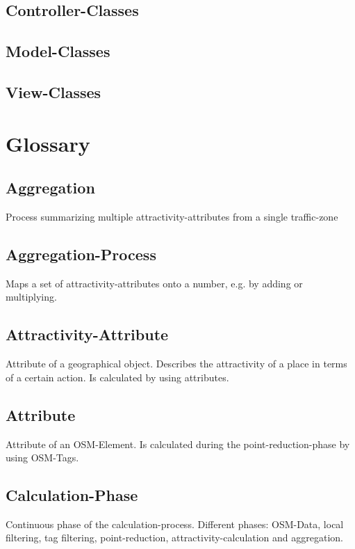 \documentclass[parskip=full]{scrartcl} %
\begin{document}
\subsection{Controller-Classes}

\subsection{Model-Classes}

\subsection{View-Classes}

\newpage


\section{Glossary}

\subsection*{Aggregation}
Process summarizing multiple attractivity-attributes from a single traffic-zone

\subsection*{Aggregation-Process}
Maps a set of attractivity-attributes onto a number, e.g. by adding or multiplying.

\subsection*{Attractivity-Attribute}
Attribute of a geographical object. Describes the attractivity of a place in terms of a certain action. Is calculated by using attributes.

\subsection*{Attribute}
Attribute of an OSM-Element. Is calculated during the point-reduction-phase by using OSM-Tags.

\subsection*{Calculation-Phase}
Continuous phase of the calculation-process. Different phases: OSM-Data, local filtering, tag filtering, point-reduction, attractivity-calculation and aggregation.
\end{document}
